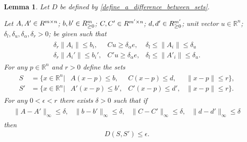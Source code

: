 \documentclass{article}
\newtheorem{lemma}[theorem]{Lemma}
\theoremstyle{case}
\numberwithin{theorem}{subsection}
\newcommand{\Rn}{\mathbb R^n}
\newcommand{\convexdistance}{{D}}
\begin{document}
\begin{lemma}
\label{the_lemma_to_end_all_lemmas}
Let $\convexdistance$ be defined by \cref{define_a_difference_between_sets}.

Let
$A, A' \in \mathbb \mathbb R^{m \times n}$;
$b, b' \in \mathbb \mathbb R^{m}_{\ge 0}$;
$C, C' \in \mathbb \mathbb R^{m' \times n}$;
$d, d' \in \mathbb \mathbb R^{m'}_{\ge 0}$;
unit vector $u \in \Rn$;
$\delta_l, \delta_u, \delta_{\alpha}, \delta_r > 0$;
be given such that 
\begin{align*}
\begin{array}{cccc}
\delta_r \|A_i\| \le b_i,			&
Cu \ge \delta_{\alpha} e,			&
\delta_l \le \|A_i\| \le \delta_u	\\
\delta_r \|A_i'\| \le b_i',			&
C'u \ge \delta_{\alpha} e, 			&
\delta_l \le \|A'_i\| \le \delta_u.
\end{array}
\end{align*}
For any $p \in \Rn$ and $r > 0$ define the sets
\begin{align*}
\begin{array}{ccccc}
S  &= \bigg\{x \in \Rn \bigg|& A (x - p) \le b ,& C (x - p) \le d ,& \|x - p\| \le r \bigg\}, \\
S' &= \bigg\{x \in \Rn \bigg|& A'(x - p) \le b',& C'(x - p) \le d',& \|x - p\| \le r \bigg\}.
\end{array}
\end{align*}
For any $0 < \epsilon < r$ there exists $\delta > 0$ such that if
\begin{align*}
\begin{array}{cccc}
\|A - A'\|_{\infty} \le \delta,	& \|b - b'\|_{\infty} \le \delta,		& \|C - C'\|_{\infty} \le \delta,	& \|d - d'\|_{\infty} \le \delta
\end{array}
\end{align*}
then
\begin{align*}
D(S, S') \le \epsilon.
\end{align*}





\end{lemma}
\end{document}
